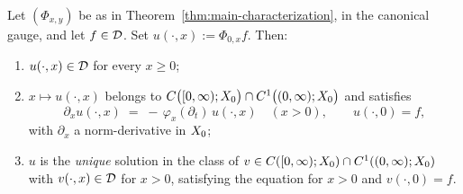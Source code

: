 \begin{theorem}\label{thm:scale-cauchy}
Let $(\Phi_{x,y})$ be as in Theorem~\ref{thm:main-characterization}, in the canonical gauge,
and let $f \in \mathcal{D}$. Set $u(\cdot, x) := \Phi_{0,x} f$. Then:
\begin{enumerate}
\item $u(\cdot, x) \in \mathcal{D}$ for every $x \ge 0$;
\item $x \mapsto u(\cdot, x)$ belongs to
$C\bigl([0,\infty); X_0\bigr) \cap C^1\bigl((0,\infty); X_0\bigr)$ and satisfies
\[
  \partial_x u(\cdot, x) \;=\; -\,\varphi_x(\partial_t)\,u(\cdot, x) \quad (x > 0),
  \qquad u(\cdot, 0) = f,
\]
with $\partial_x$ a norm-derivative in $X_0$;
\item $u$ is the \emph{unique} solution in the class of
$v \in C([0,\infty); X_0) \cap C^1((0,\infty); X_0)$ with $v(\cdot, x) \in \mathcal{D}$ for
$x > 0$, satisfying the equation for $x > 0$ and $v(\cdot, 0) = f$.
\end{enumerate}
\end{theorem}

